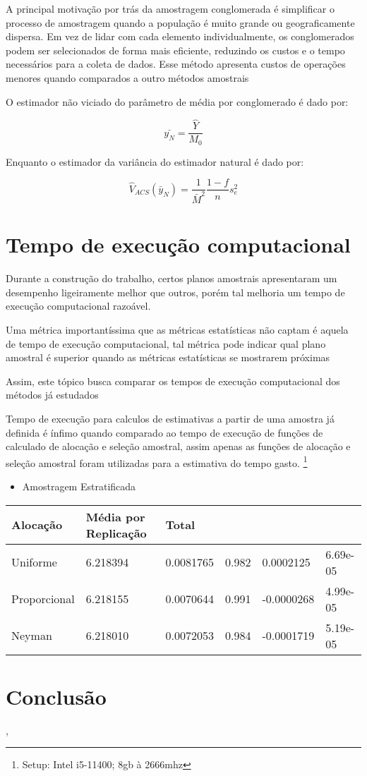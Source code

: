 \documentclass[sn-basic,pdflatex]{sn-jnl}
\theoremstyle{remark}
\theoremstyle{definition}
\providecommand{\tightlist}{%
  \setlength{\itemsep}{0pt}\setlength{\parskip}{0pt}}
\begin{document}
A principal motivação por trás da amostragem conglomerada é simplificar
o processo de amostragem quando a população é muito grande ou
geograficamente dispersa. Em vez de lidar com cada elemento
individualmente, os conglomerados podem ser selecionados de forma mais
eficiente, reduzindo os custos e o tempo necessários para a coleta de
dados. Esse método apresenta custos de operações menores quando
comparados a outro métodos amostrais

O estimador não viciado do parâmetro de média por conglomerado é dado
por:

\[\bar{y_N} = \frac{\hat{Y}}{M_0}\]

Enquanto o estimador da variância do estimador natural é dado por:

\[\hat V_{ACS}(\bar y_{N}) = \frac{1}{\bar M^2}\frac{1-f}{n}s_e^2\]

\hypertarget{tempo-de-execuuxe7uxe3o-computacional}{%
\section{Tempo de execução
computacional}\label{tempo-de-execuuxe7uxe3o-computacional}}

Durante a construção do trabalho, certos planos amostrais apresentaram
um desempenho ligeiramente melhor que outros, porém tal melhoria um
tempo de execução computacional razoável.

Uma métrica importantíssima que as métricas estatísticas não captam é
aquela de tempo de execução computacional, tal métrica pode indicar qual
plano amostral é superior quando as métricas estatísticas se mostrarem
próximas

Assim, este tópico busca comparar os tempos de execução computacional
dos métodos já estudados

Tempo de execução para calculos de estimativas a partir de uma amostra
já definida é ínfimo quando comparado ao tempo de execução de funções de
calculado de alocação e seleção amostral, assim apenas as funções de
alocação e seleção amostral foram utilizadas para a estimativa do tempo
gasto. \footnote{Setup: Intel i5-11400; 8gb à 2666mhz}

\begin{itemize}
\tightlist
\item
  Amostragem Estratificada
\end{itemize}

\begin{longtable}[]{@{}llllll@{}}
\toprule
Alocação & Média por Replicação & Total & & & \\
\midrule
\endhead
Uniforme & 6.218394 & 0.0081765 & 0.982 & 0.0002125 & 6.69e-05 \\
Proporcional & 6.218155 & 0.0070644 & 0.991 & -0.0000268 & 4.99e-05 \\
Neyman & 6.218010 & 0.0072053 & 0.984 & -0.0001719 & 5.19e-05 \\
\bottomrule
\end{longtable}

\hypertarget{conclusuxe3o}{%
\section{Conclusão}\label{conclusuxe3o}}

\citet{pfeffermann1996use}, \citet{kleijnen1995verification}


\end{document}
